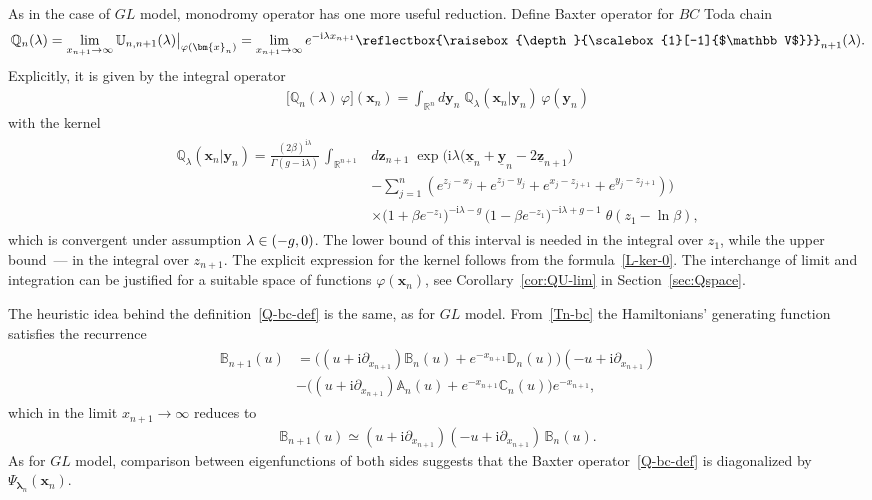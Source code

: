 \documentclass[11pt]{article}
\numberwithin{equation}{section}
\theoremstyle{plain}
\theoremstyle{definition}
\newcommand{\bbLambda}{\reflectbox{\raisebox{\depth}{\scalebox{1}[-1]{$\mathbb V$}}}}
\newcommand{\A}{\mathbb{A}}
\newcommand{\B}{\mathbb{B}}
\newcommand{\C}{\mathbb{C}}
\newcommand{\D}{\mathbb{D}}
\newcommand{\LLambda}{\bbLambda}
\newcommand{\QQ}{\mathbb{Q}}
\newcommand{\MMO}{\mathbb{U}}
\let\Im\relax
\DeclareMathOperator{\Im}{Im}
\renewcommand{\phi}{\varphi}
\renewcommand{\imath}{\mathrm{i}}
\begin{document}
As in the case of $GL$ model, monodromy operator has one more useful reduction. Define Baxter operator for $BC$ Toda chain
\begin{align} \label{Q-bc-def}
	\QQ_n(\lambda) = \lim_{x_{n + 1} \to \infty} \MMO_{n, n + 1}(\lambda) \bigr|_{\phi(\bm{x}_n)} = \lim_{x_{n + 1} \to \infty} e^{-\imath \lambda x_{n + 1}} \LLambda_{n + 1}(\lambda) .
\end{align}
Explicitly, it is given by the integral operator
\begin{align}
	\bigl[ \QQ_n(\lambda) \, \phi \bigr] (\bm{x}_n) = \int_{\mathbb{R}^{n}} d\bm{y}_{n} \; \QQ_\lambda(\bm{x}_n | \bm{y}_{n}) \, \phi(\bm{y}_{n})
\end{align}
with the kernel
\begin{align}
	\begin{aligned}
		\QQ_\lambda(\bm{x}_n | \bm{y}_{n}) =  \frac{(2\beta)^{\imath \lambda}}{\Gamma(g - \imath \lambda)} \, \int_{\mathbb{R}^{n + 1}} & d\bm{z}_{n + 1} \; \exp \biggl( \imath \lambda \bigl( \underline{\bm{x}}_n + \underline{\bm{y}}_{n} - 2 \underline{\bm{z}}_{n + 1} \bigr) \\[6pt]
		&  - \sum_{j = 1}^{n} (e^{z_j - x_j} + e^{z_j - y_j} + e^{x_j - z_{j + 1}} + e^{y_j - z_{j + 1}} ) \biggr) \\[6pt]
		&  \times \bigl(1 + \beta e^{-z_1}\bigr)^{- \imath \lambda - g } \, \bigl(1 - \beta e^{-z_1}\bigr)^{- \imath \lambda + g - 1 } \; \theta(z_1 - \ln \beta),
	\end{aligned}
\end{align}
which is convergent under assumption $\Im \lambda \in (-g, 0)$. The lower bound of this interval is needed in the integral over $z_1$, while the upper bound~--- in the integral over $z_{n + 1}$. The explicit expression for the kernel follows from the formula~\eqref{L-ker-0}. The interchange of limit and integration can be justified for a suitable space of functions $\phi(\bm{x}_n)$, see Corollary~\ref{cor:QU-lim} in Section~\ref{sec:Qspace}.

The heuristic idea behind the definition~\eqref{Q-bc-def} is the same, as for $GL$ model. From~\eqref{Tn-bc} the Hamiltonians' generating function satisfies the recurrence
\begin{align}
	\begin{aligned}
		\B_{n + 1}(u) & = \bigl( (u + \imath \partial_{x_{n + 1}}) \B_n(u) + e^{-x_{n + 1}} \D_n(u) \bigr) (-u + \imath \partial_{x_{n + 1}}) \\[6pt]
		& -  \bigl( (u + \imath \partial_{x_{n + 1}}) \A_n(u) + e^{-x_{n + 1}} \C_n(u) \bigr) e^{-x_{n + 1}},
	\end{aligned}
\end{align}
which in the limit $x_{n + 1} \to \infty$ reduces to
\begin{align}
	\B_{n + 1}(u) \simeq (u + \imath \partial_{x_{n + 1}}) (-u + \imath \partial_{x_{n + 1}}) \, \B_n(u).
\end{align}
As for $GL$ model, comparison between eigenfunctions of both sides suggests that the Baxter operator~\eqref{Q-bc-def} is diagonalized by $\Psi_{\bm{\lambda}_n}(\bm{x}_n)$.
\end{document}
